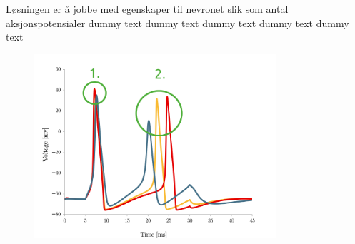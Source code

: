 \documentclass[presentation]{beamer}
\begin{document}
\begin{frame}{Løsningen er å jobbe med egenskaper til nevronet slik som antal aksjonspotensialer{\color{white} dummy text dummy text dummy text dummy text dummy text} }
\vspace{-5mm}
\begin{figure}
   \includegraphics[width=0.8\textwidth]{hh_features.png}
\end{figure}
\end{frame}




\end{document}
